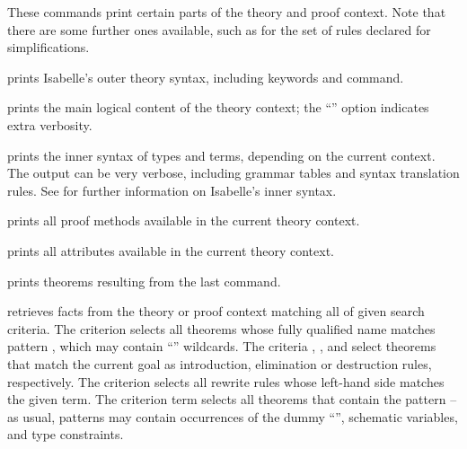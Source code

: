 \begin{isabellebody}
\begin{isamarkuptext}
  These commands print certain parts of the theory and proof context.
  Note that there are some further ones available, such as for the set
  of rules declared for simplifications.

  \begin{descr}
  
  \item [\mbox{\isa{\isacommand{print{\isacharunderscore}commands}}}] prints Isabelle's outer theory
  syntax, including keywords and command.
  
  \item [\mbox{\isa{\isacommand{print{\isacharunderscore}theory}}}] prints the main logical content of
  the theory context; the ``\isa{{\isachardoublequote}{\isacharbang}{\isachardoublequote}}'' option indicates extra
  verbosity.

  \item [\mbox{\isa{\isacommand{print{\isacharunderscore}syntax}}}] prints the inner syntax of types
  and terms, depending on the current context.  The output can be very
  verbose, including grammar tables and syntax translation rules.  See
  \cite[\S7, \S8]{isabelle-ref} for further information on Isabelle's
  inner syntax.
  
  \item [\mbox{\isa{\isacommand{print{\isacharunderscore}methods}}}] prints all proof methods
  available in the current theory context.
  
  \item [\mbox{\isa{\isacommand{print{\isacharunderscore}attributes}}}] prints all attributes
  available in the current theory context.
  
  \item [\mbox{\isa{\isacommand{print{\isacharunderscore}theorems}}}] prints theorems resulting from
  the last command.
  
  \item [\mbox{\isa{\isacommand{find{\isacharunderscore}theorems}}}~\isa{criteria}] retrieves facts
  from the theory or proof context matching all of given search
  criteria.  The criterion  selects all theorems
  whose fully qualified name matches pattern , which may
  contain ``\isa{{\isachardoublequote}{\isacharasterisk}{\isachardoublequote}}'' wildcards.  The criteria ,
  , and  select theorems that match the
  current goal as introduction, elimination or destruction rules,
  respectively.  The criterion  selects all rewrite
  rules whose left-hand side matches the given term.  The criterion
  term  selects all theorems that contain the pattern  -- as usual, patterns may contain occurrences of the dummy
  ``\isa{{\isacharunderscore}}'', schematic variables, and type constraints.
  

\end{descr}
\end{isamarkuptext}
\end{isabellebody}
